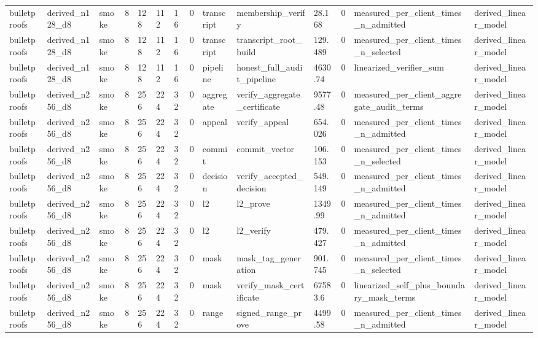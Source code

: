 \begin{table}[t]
\begin{tabular}{llllllllllllll}
bulletproofs & derived\_n128\_d8 & smoke & 8 & 128 & 112 & 16 & 0 & transcript & membership\_verify & 28.168 & 0 & measured\_per\_client\_times\_n\_admitted & derived\_linear\_model \\
bulletproofs & derived\_n128\_d8 & smoke & 8 & 128 & 112 & 16 & 0 & transcript & transcript\_root\_build & 129.489 & 0 & measured\_per\_client\_times\_n\_selected & derived\_linear\_model \\
bulletproofs & derived\_n128\_d8 & smoke & 8 & 128 & 112 & 16 & 0 & pipeline & honest\_full\_audit\_pipeline & 4630.74 & 0 & linearized\_verifier\_sum & derived\_linear\_model \\
bulletproofs & derived\_n256\_d8 & smoke & 8 & 256 & 224 & 32 & 0 & aggregate & verify\_aggregate\_certificate & 9577.48 & 0 & measured\_per\_client\_aggregate\_audit\_terms & derived\_linear\_model \\
bulletproofs & derived\_n256\_d8 & smoke & 8 & 256 & 224 & 32 & 0 & appeal & verify\_appeal & 654.026 & 0 & measured\_per\_client\_times\_n\_admitted & derived\_linear\_model \\
bulletproofs & derived\_n256\_d8 & smoke & 8 & 256 & 224 & 32 & 0 & commit & commit\_vector & 106.153 & 0 & measured\_per\_client\_times\_n\_selected & derived\_linear\_model \\
bulletproofs & derived\_n256\_d8 & smoke & 8 & 256 & 224 & 32 & 0 & decision & verify\_accepted\_decision & 549.149 & 0 & measured\_per\_client\_times\_n\_admitted & derived\_linear\_model \\
bulletproofs & derived\_n256\_d8 & smoke & 8 & 256 & 224 & 32 & 0 & l2 & l2\_prove & 1349.99 & 0 & measured\_per\_client\_times\_n\_admitted & derived\_linear\_model \\
bulletproofs & derived\_n256\_d8 & smoke & 8 & 256 & 224 & 32 & 0 & l2 & l2\_verify & 479.427 & 0 & measured\_per\_client\_times\_n\_admitted & derived\_linear\_model \\
bulletproofs & derived\_n256\_d8 & smoke & 8 & 256 & 224 & 32 & 0 & mask & mask\_tag\_generation & 901.745 & 0 & measured\_per\_client\_times\_n\_selected & derived\_linear\_model \\
bulletproofs & derived\_n256\_d8 & smoke & 8 & 256 & 224 & 32 & 0 & mask & verify\_mask\_certificate & 67583.6 & 0 & linearized\_self\_plus\_boundary\_mask\_terms & derived\_linear\_model \\
bulletproofs & derived\_n256\_d8 & smoke & 8 & 256 & 224 & 32 & 0 & range & signed\_range\_prove & 4499.58 & 0 & measured\_per\_client\_times\_n\_admitted & derived\_linear\_model \\

\end{tabular}
\end{table}
